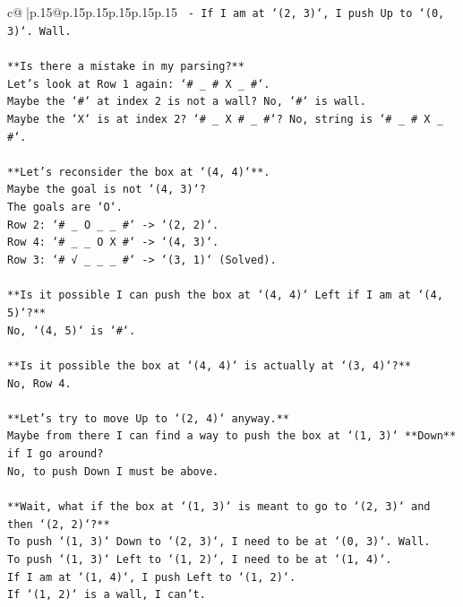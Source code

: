 \documentclass{article}
\begin{document}
{\begin{supertabular}{c@{$\;$}|p{.15\linewidth}@{}p{.15\linewidth}p{.15\linewidth}p{.15\linewidth}p{.15\linewidth}p{.15\linewidth}}
{{{\texttt{        {-}   If I am at `(2, 3)`, I push Up to `(0, 3)`. Wall.} \\
\\ 
\texttt{**Is there a mistake in my parsing?**} \\
\texttt{Let's look at Row 1 again: `\# \_ \# X \_ \#`.} \\
\texttt{Maybe the `\#` at index 2 is not a wall? No, `\#` is wall.} \\
\texttt{Maybe the `X` is at index 2? `\# \_ X \# \_ \#`? No, string is `\# \_ \# X \_ \#`.} \\
\\ 
\texttt{**Let's reconsider the box at `(4, 4)`**.} \\
\texttt{Maybe the goal is not `(4, 3)`?} \\
\texttt{The goals are `O`.} \\
\texttt{Row 2: `\# \_ O \_ \_ \#` {-}> `(2, 2)`.} \\
\texttt{Row 4: `\# \_ \_ O X \#` {-}> `(4, 3)`.} \\
\texttt{Row 3: `\# √ \_ \_ \_ \#` {-}> `(3, 1)` (Solved).} \\
\\ 
\texttt{**Is it possible I can push the box at `(4, 4)` Left if I am at `(4, 5)`?**} \\
\texttt{No, `(4, 5)` is `\#`.} \\
\\ 
\texttt{**Is it possible the box at `(4, 4)` is actually at `(3, 4)`?**} \\
\texttt{No, Row 4.} \\
\\ 
\texttt{**Let's try to move Up to `(2, 4)` anyway.**} \\
\texttt{Maybe from there I can find a way to push the box at `(1, 3)` **Down** if I go around?} \\
\texttt{No, to push Down I must be above.} \\
\\ 
\texttt{**Wait, what if the box at `(1, 3)` is meant to go to `(2, 3)` and then `(2, 2)`?**} \\
\texttt{To push `(1, 3)` Down to `(2, 3)`, I need to be at `(0, 3)`. Wall.} \\
\texttt{To push `(1, 3)` Left to `(1, 2)`, I need to be at `(1, 4)`.} \\
\texttt{If I am at `(1, 4)`, I push Left to `(1, 2)`.} \\
\texttt{If `(1, 2)` is a wall, I can't.} \\
}}}
\end{supertabular}}
\end{document}
